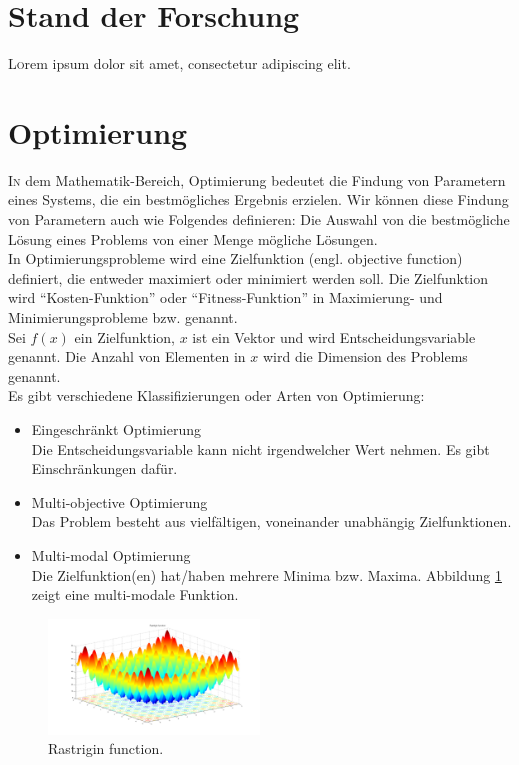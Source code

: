 \documentclass[twoside,twocolumn]{article}
\begin{document}
\section{Stand der Forschung}

\lettrine[nindent=0em,lines=3]{L} orem ipsum dolor sit amet, consectetur adipiscing elit.
\blindtext %


\section{Optimierung}

\lettrine[nindent=0em,lines=3]{I} n dem Mathematik-Bereich, Optimierung bedeutet die Findung von Parametern eines Systems, die ein bestmögliches Ergebnis erzielen. \cite{wiki_optimierung} Wir können diese Findung von Parametern auch wie Folgendes definieren: Die Auswahl von die bestmögliche Lösung eines Problems von einer Menge mögliche Lösungen.\\
In Optimierungsprobleme wird eine Zielfunktion (engl. objective function) definiert, die entweder maximiert oder minimiert werden soll. Die Zielfunktion wird ``Kosten-Funktion'' oder ``Fitness-Funktion'' in Maximierung- und Minimierungsprobleme bzw. genannt.\\
Sei $f(x)$ ein Zielfunktion, $x$ ist ein Vektor und wird Entscheidungsvariable genannt. Die Anzahl von Elementen in $x$ wird die Dimension des Problems genannt.\\
Es gibt verschiedene Klassifizierungen oder Arten von Optimierung:

\begin{itemize}
\item{Eingeschränkt Optimierung}\\
Die Entscheidungsvariable kann nicht irgendwelcher Wert nehmen. Es gibt Einschränkungen dafür.\\
\item{Multi-objective Optimierung}\\
Das Problem besteht aus vielfältigen, voneinander unabhängig Zielfunktionen.\\
\item{Multi-modal Optimierung}\\
Die Zielfunktion(en) hat/haben mehrere Minima bzw. Maxima. Abbildung \ref{fig:rastrigin} zeigt eine multi-modale Funktion.
\end{itemize}

\begin{figure}[h]
\caption{ Rastrigin function.}
\label{fig:rastrigin}
\centering
\includegraphics[width=0.5\textwidth]{images/rastrigin_function.png}
\end{figure}
\end{document}

